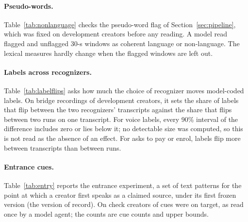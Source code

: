 \paragraph{Pseudo-words.} Table~\ref{tab:nonlanguage} checks the pseudo-word flag of Section~\ref{sec:pipeline}, which
was fixed on development creators before any reading. A model read flagged and unflagged 30-s windows as coherent
language or non-language. The lexical measures hardly change when the flagged windows are left out.

\paragraph{Labels across recognizers.} Table~\ref{tab:labelflips} asks how much the choice of recognizer moves
model-coded labels. On bridge recordings of development creators, it sets the share of labels that flip between the two
recognizers' transcripts against the share that flips between two runs on one transcript. For voice labels, every 90\%
interval of the difference includes zero or lies below it; no detectable size was computed, so this is not read
as the absence of an effect. For asks to pay or enrol, labels flip more between
transcripts than between runs.

\paragraph{Entrance cues.} Table~\ref{tab:entry} reports the entrance experiment, a set of text patterns for the point
at which a creator first speaks as a claimed source, under its first frozen version (the version of record). On check creators
\EntryReadOn{} of \EntryRead{} cues were on target, as read once by a model agent; the counts are cue counts and upper
bounds.

\begin{table}[ht]
\centering
\small

\caption{Interim census of recording kinds and claimed-voice bands on \LOneRecordings{} recordings of \LOneCreators{}
development creators: counts ($n$) and creator-weighted shares of recordings with 95\% creator-bootstrap intervals,
under the small model (S, the modal kind of five runs) and the middle model (M), with their specific agreement (Agr.)
and run-to-run stability (Stab.). Model-coded, not checked by a person; development creators only; interim, from the voice instrument as it stood
before the instrument freeze. It replaces
a count from a purposive reading. \LabelValidity}
\label{tab:kinds}
\end{table}

